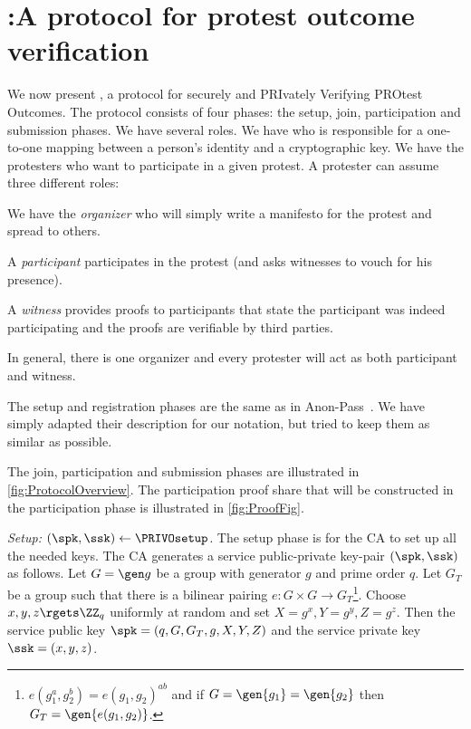 \section{\PRIVO:\@ A protocol for protest outcome verification}%
\label{Protocol}


We now present \PRIVO, a protocol for securely and PRIvately Verifying PROtest 
Outcomes.
The protocol consists of four phases: the setup, join, participation and 
submission phases.
We have several roles.
We have  who is responsible for a one-to-one mapping between a person's 
identity and a cryptographic key.
We have the protesters who want to participate in a given protest.
A protester can assume three different roles:
\begin{enumerate*}
\item We have the \emph{organizer} who will simply write a manifesto for the 
  protest and spread to others.
\item A \emph{participant} participates in the protest (and asks witnesses to 
  vouch for his presence).
\item A \emph{witness} provides proofs to participants that state the 
  participant was indeed participating and the proofs are verifiable by third 
  parties.
\end{enumerate*}
In general, there is one organizer and every protester will act as both 
participant and witness.

The setup and registration phases are the same as in Anon-Pass~\cite{AnonPass}.
We have simply adapted their description for our notation, but tried to keep 
them as similar as possible.

The join, participation and submission phases are illustrated in 
\cref{fig:ProtocolOverview}.
The participation proof share that will be constructed in the participation 
phase is illustrated in \cref{fig:ProofFig}.


\emph{Setup: \((\spk, \ssk)\gets \PRIVOsetup\).}
The setup phase is for the \ac{CA} to set up all the needed keys.
The \ac{CA} generates a service public-private key-pair \((\spk, \ssk)\) as 
follows.
Let \(G = \gen g\) be a group with generator \(g\) and prime order \(q\).
Let \(G_T\) be a group such that there is a bilinear pairing \(e\colon G\times 
  G\to G_T\)\footnote{%
  \Ie \(e(g_1^a, g_2^b) = e(g_1, g_2)^{ab}\) and if \(G = \gen{g_1} = 
    \gen{g_2}\) then \(G_T = \gen{e(g_1, g_2)}\).
}.
Choose \(x,y,z\rgets \ZZ_q\) uniformly at random and set \(X = g^x, Y = g^y, Z = 
  g^z\).
Then the service public key \(\spk = (q, G, G_T, g, X, Y, Z)\) and the service 
private key \(\ssk = (x, y, z)\).

